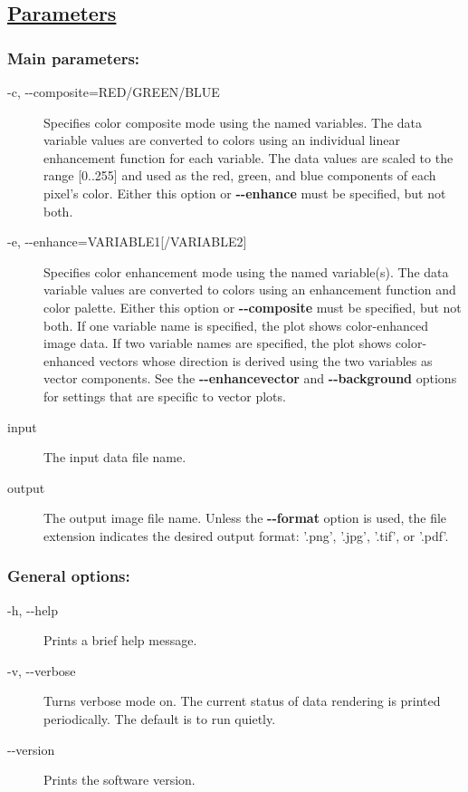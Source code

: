 \subsection*{\underline{Parameters}}
\subsubsection*{Main parameters:}
\begin{description}
\item[-c, -{-}composite=RED/GREEN/BLUE]Specifies color composite mode using the named variables. The data variable values are converted to colors using an individual linear enhancement function for each variable. The data values are scaled to the range [0..255] and used as the red, green, and blue components of each pixel's color. Either this option or \textbf{-{-}enhance}
 must be specified, but not both.
\item[-e, -{-}enhance=VARIABLE1[/VARIABLE2{]}]Specifies color enhancement mode using the named variable(s). The data variable values are converted to colors using an enhancement function and color palette. Either this option or \textbf{-{-}composite}
 must be specified, but not both. If one variable name is specified, the plot shows color-enhanced image data. If two variable names are specified, the plot shows color-enhanced vectors whose direction is derived using the two variables as vector components. See the \textbf{-{-}enhancevector}
 and \textbf{-{-}background}
 options for settings that are specific to vector plots.
\item[input]The input data file name.
\item[output]The output image file name. Unless the \textbf{-{-}format}
 option is used, the file extension indicates the desired output format: '.png', '.jpg', '.tif', or '.pdf'.

\end{description}
\subsubsection*{General options:}
\begin{description}
\item[-h, -{-}help]Prints a brief help message.
\item[-v, -{-}verbose]Turns verbose mode on. The current status of data rendering is printed periodically. The default is to run quietly.
\item[-{-}version]Prints the software version.

\end{description}
